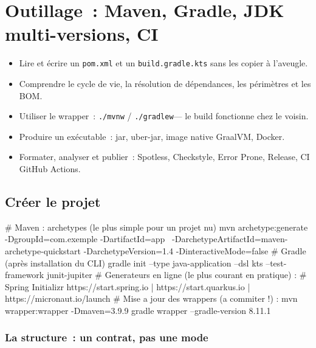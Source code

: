 \documentclass[12pt,a4paper,twoside,openright]{book}
\newcommand{\fichier}[1]{\texttt{\color{pathgreen}#1}}
\begin{document}
\chapter{Outillage~: Maven, Gradle, JDK multi-versions, CI}
\label{ch-java-build}

\begin{objectif}
\begin{itemize}
  \item Lire et \'ecrire un \fichier{pom.xml} et un \fichier{build.gradle.kts} sans les copier \`a l'aveugle.
  \item Comprendre le cycle de vie, la r\'esolution de d\'ependances, les p\'erim\`etres et les BOM.
  \item Utiliser le wrapper~: \verb|./mvnw| / \verb|./gradlew|--- le build fonctionne chez le voisin.
  \item Produire un ex\'ecutable~: jar, uber-jar, image native GraalVM, Docker.
  \item Formater, analyser et publier~: Spotless, Checkstyle, Error Prone, Release, CI GitHub Actions.
\end{itemize}
\end{objectif}

\section{Cr\'eer le projet}

\begin{terminal}
# Maven : archetypes (le plus simple pour un projet nu)
mvn archetype:generate -DgroupId=com.exemple -DartifactId=app \
    -DarchetypeArtifactId=maven-archetype-quickstart -DarchetypeVersion=1.4 -DinteractiveMode=false
# Gradle (apr\`es installation du CLI)
gradle init --type java-application --dsl kts --test-framework junit-jupiter
# Generateurs en ligne (le plus courant en pratique) :
#   Spring Initializr https://start.spring.io  |  https://start.quarkus.io  |  https://micronaut.io/launch
# Mise a jour des wrappers (a commiter !) :
mvn wrapper:wrapper -Dmaven=3.9.9
gradle wrapper --gradle-version 8.11.1
\end{terminal}

\subsection{La structure~: un contrat, pas une mode}
\end{document}
